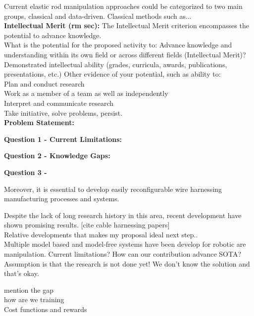\documentclass[12pt]{article}
\begin{document}
Current elastic rod manipulation approaches could be categorized to two main groups, classical and data-driven. Classical methods such as...\\



\noindent
\textbf{Intellectual Merit (rm sec):} The Intellectual Merit criterion encompasses the potential to advance knowledge.\\
What is the potential for the proposed activity to:
Advance knowledge and understanding within its own field or across different fields (Intellectual Merit)?\\
Demonstrated intellectual ability (grades, curricula, awards, publications, presentations, etc.)
Other evidence of your potential, such as ability to:\\
Plan and conduct research\\
Work as a member of a team as well as independently\\
Interpret and communicate research\\
Take initiative, solve problems, persist.\\

\noindent
\textbf{Problem Statement:}

\noindent
\textbf{Question 1 - Current Limitations:}

\noindent
\textbf{Question 2 - Knowledge Gaps:}

\noindent
\textbf{Question 3 - }

Moreover, it is essential to develop easily reconfigurable wire harnessing manufacturing processes and systems.


\noindent
Despite the lack of long research history in this area, recent development have shown promising results. [cite cable harnessing papers]\\

Relative developments that makes my proposal ideal next step..\\

Multiple model based and model-free systems have been develop for robotic are
manipulation.
Current limitations?
How can our contribution advance SOTA? 
Assumption is that the research is not done yet! We don’t know the solution and that's okay.

mention the gap\\
how are we training\\
Cost functions and rewards\\
\end{document}

